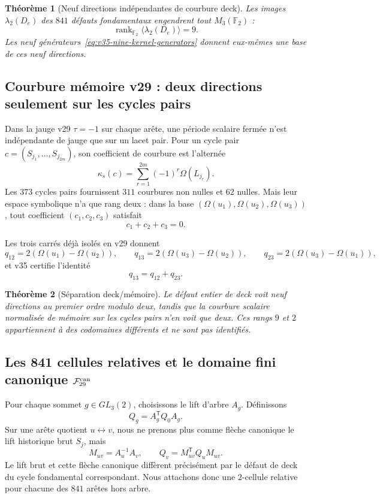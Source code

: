 \documentclass[11pt,a4paper]{article}
\newtheorem{theorem}{Théorème}[section]
\newcommand{\rank}{\operatorname{rank}}
\begin{document}
\begin{theorem}[Neuf directions ind\'ependantes de courbure deck]\label{thm:v35-lambda2-rank9}
Les images $\lambda_2(D_e)$ des $841$ d\'efauts fondamentaux engendrent tout
$M_3(\mathbb F_2)$ :
\[
 \boxed{\rank_{\mathbb F_2}\langle\lambda_2(D_e)\rangle=9.}
\]
Les neuf g\'en\'erateurs~\eqref{eq:v35-nine-kernel-generators} donnent eux-m\^emes une base de ces
neuf directions.
\end{theorem}

\subsection{Courbure m\'emoire v29 : deux directions seulement sur les cycles pairs}

Dans la jauge v29 $\tau=-1$ sur chaque ar\^ete, une p\'eriode scalaire ferm\'ee n'est
ind\'ependante de jauge que sur un lacet pair. Pour un cycle pair
$c=(S_{j_1},\ldots,S_{j_{2m}})$, son coefficient de courbure est l'altern\'ee
\[
 \kappa_s(c)=\sum_{r=1}^{2m}(-1)^r\Omega(L_{j_r}).
\]
Les $373$ cycles pairs fournissent $311$ courbures non nulles et $62$ nulles. Mais leur espace
symbolique n'a que rang deux : dans la base
$(\Omega(u_1),\Omega(u_2),\Omega(u_3))$, tout coefficient $(c_1,c_2,c_3)$ satisfait
\[
 c_1+c_2+c_3=0.
\]

Les trois carr\'es d\'ej\`a isol\'es en v29 donnent
\[
 q_{12}=2(\Omega(u_1)-\Omega(u_2)),\qquad
 q_{13}=2(\Omega(u_3)-\Omega(u_2)),\qquad
 q_{23}=2(\Omega(u_3)-\Omega(u_1)),
\]
et v35 certifie l'identit\'e
\begin{equation}\label{eq:v35-square-curvature-relation}
 \boxed{q_{13}=q_{12}+q_{23}.}
\end{equation}

\begin{theorem}[S\'eparation deck/m\'emoire]\label{thm:v35-deck-memory-ranks}
Le d\'efaut entier de deck voit neuf directions au premier ordre modulo deux, tandis que la
courbure scalaire normalis\'ee de m\'emoire sur les cycles pairs n'en voit que deux. Ces rangs
$9$ et $2$ appartiennent \`a des codomaines diff\'erents et ne sont pas identifi\'es.
\end{theorem}

\subsection{Les 841 cellules relatives et le domaine fini canonique $\mathcal F_{29}^{\rm can}$}

Pour chaque sommet $g\in GL_3(2)$, choisissons le lift d'arbre $A_g$. D\'efinissons
\[
 Q_g=A_g^{\mathsf T}Q_0A_g.
\]
Sur une ar\^ete quotient $u\leftrightarrow v$, nous ne prenons plus comme fl\`eche canonique le lift
historique brut $S_j$, mais
\begin{equation}\label{eq:v35-canonical-edge}
 \boxed{M_{uv}=A_u^{-1}A_v,\qquad Q_v=M_{uv}^{\mathsf T}Q_uM_{uv}.}
\end{equation}
Le lift brut et cette fl\`eche canonique diff\`erent pr\'ecis\'ement par le d\'efaut de deck du cycle
fondamental correspondant. Nous attachons donc une $2$-cellule relative pour chacune des
$841$ ar\^etes hors arbre.
\end{document}
